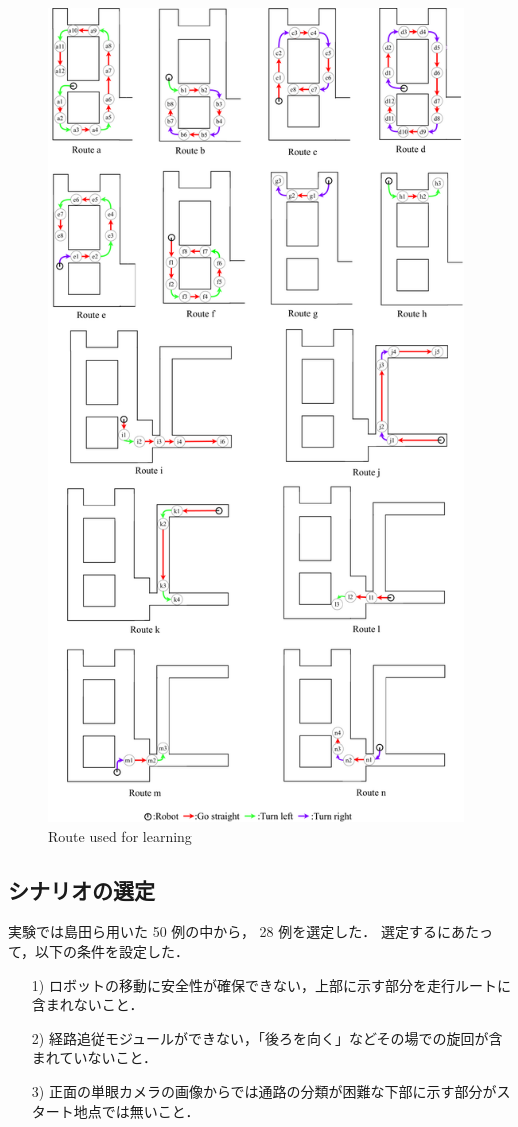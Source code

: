 \begin{figure}
  \centering
  \includegraphics[width=110mm]{images/pdf/ishiguro/route.pdf}
  \caption{Route used for learning}
  \label{fig:route}
\end{figure}

\newpage
\subsection{シナリオの選定}
実験では島田ら用いた 50 例の中から， 28 例を選定した．
選定するにあたって，以下の条件を設定した．

\begin{enumerate}
  \item [1)] ロボットの移動に安全性が確保できない，上部に示す部分を走行ルートに含まれないこと．
  \item [2)] 経路追従モジュールができない，「後ろを向く」などその場での旋回が含まれていないこと．
  \item [3)] 正面の単眼カメラの画像からでは通路の分類が困難な下部に示す部分がスタート地点では無いこと．
\end{enumerate}
 
